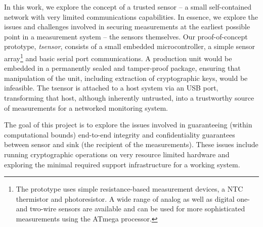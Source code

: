In this work, we explore the concept of a trusted sensor -- a small self-contained network with very limited communications capabilities. In essence, we explore the issues and challenges involved in securing measurements at the earliest possible point in a measurement system -- the sensors themselves.
%
Our proof-of-concept prototype, \textit{tsensor}, consists of a small embedded microcontroller, a simple sensor array\footnote{The prototype uses simple resistance-based measurement devices, a NTC thermistor and photoresistor. A wide range of analog as well as digital one- and two-wire sensors are available and can be used for more sophisticated measurements using the ATmega processor.} and basic serial port communications. A production unit would be embedded in a permanently sealed and tamper-proof package, ensuring that manipulation of the unit, including extraction of cryptographic keys, would be infeasible. 
The tsensor is attached to a host system via an USB port, transforming that host, although inherently untrusted, into a trustworthy source of measurements for a networked monitoring system.

The goal of this project is to explore the issues involved in guaranteeing (within computational bounds) end-to-end integrity and confidentiality guarantees between sensor and sink (the recipient of the measurements). These issues include running cryptographic operations on very resource limited hardware and exploring the minimal required support infrastructure for a working system.


%

